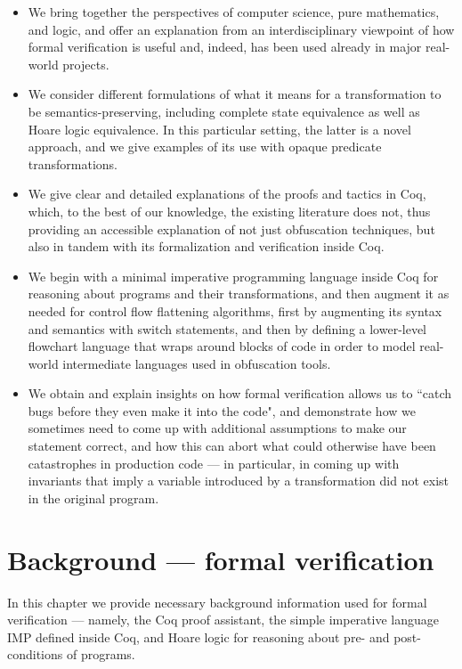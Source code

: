 \documentclass[12pt,notitlepage]{report}
\theoremstyle{plain}
\theoremstyle{definition}
\numberwithin{equation}{section}
\begin{document}
\begin{itemize}
    \item We bring together the perspectives of computer science, pure mathematics, and logic, and offer an explanation from an interdisciplinary viewpoint of how formal verification is useful and, indeed, has been used already in major real-world projects.
    \item We consider different formulations of what it means for a transformation to be semantics-preserving, including complete state equivalence as well as Hoare logic equivalence.  In this particular setting, the latter is a novel approach, and we give examples of its use with opaque predicate transformations.
    \item We give clear and detailed explanations of the proofs and tactics in Coq, which, to the best of our knowledge, the existing literature does not, thus providing an accessible explanation of not just obfuscation techniques, but also in tandem with its formalization and verification inside Coq.
    \item We begin with a minimal imperative programming language inside Coq for reasoning about programs and their transformations, and then augment it as needed for control flow flattening algorithms, first by augmenting its syntax and semantics with switch statements, and then by defining a lower-level flowchart language that wraps around blocks of code in order to model real-world intermediate languages used in obfuscation tools.
    \item We obtain and explain insights on how formal verification allows us to ``catch bugs before they even make it into the code", and demonstrate how we sometimes need to come up with additional assumptions to make our statement correct, and how this can abort what could otherwise have been catastrophes in production code --- in particular, in coming up with invariants that imply a  variable introduced by a transformation did not exist in the original program.

\end{itemize}

\chapter{Background --- formal verification}\label{two}
In this chapter we provide necessary background information used for formal verification --- namely, the Coq proof assistant, the simple imperative language IMP defined inside Coq, and Hoare logic for reasoning about pre- and post-conditions of programs.
\end{document}
